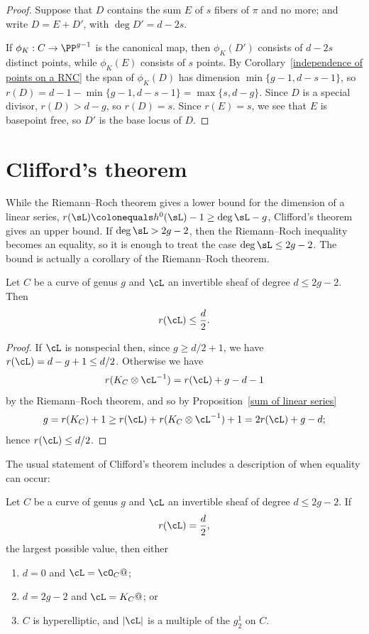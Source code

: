 \begin{proof}
Suppose that $D$ contains the sum $E$ of $s$ fibers of $\pi$ and no more; and write $D = E+D'$, with $\deg D' = d-2s$.
 
If $\phi_K:C \to \PP^{g-1}$ is the canonical map, then $\phi_K(D')$ consists of $d-2s$ distinct points, while $\phi_K(E)$ consists of
$s$ points. By Corollary~\ref{independence of points on a RNC} the span of $\phi_K(D)$ has dimension $\min\{g-1, d-s-1\}$, so 
$r(D) = d-1-\min\{g-1, d-s-1\} = \max \{s,d-g\}$. Since $D$ is a special divisor, $r(D) > d-g$, so $r(D) = s$. 
Since $r(E) =s$, we see that $E$ is basepoint free, so $D'$ is the base locus of $D$.
\end{proof}

\section{Clifford's theorem}\label{Clifford Section}

While the Riemann--Roch theorem gives a lower bound for the dimension of a linear series, $r(\sL) \colonequals h^0(\sL)-1 \geq \deg \sL -g$, Clifford's theorem
%
gives an upper bound. If $\deg \sL>2g-2$, then the Riemann--Roch
inequality becomes an equality, so it is enough to treat the case
$\deg \sL \leq 2g-2$. The bound is actually a corollary of the 
Riemann--Roch theorem.

\begin{corollary}\label{Clifford bound}
 Let $C$ be a curve of genus $g$ and $\cL$ an invertible sheaf of degree $d \leq 2g-2$. Then
$$
r(\cL) \leq \frac{d}{2}.
$$
\end{corollary}

\begin{proof}
If $\cL$ is nonspecial then, since $g\geq d/2 + 1$, we have $r(\cL) = d-g+1\leq d/2$.
Otherwise we have
$$
r(K_C\otimes \cL^{-1}) = r(\cL) +g - d - 1
$$
by the Riemann--Roch theorem,
and so by Proposition~\ref{sum of linear series}
$$
g = r(K_C)+1  \geq r(\cL) + r(K_C\otimes \cL^{-1}) +1  = 2r(\cL) +g - d;
$$
hence $r(\cL) \leq d/2$.
\end{proof}

The usual statement of Clifford's theorem includes a description of when equality can occur:

\begin{theorem}\label{Clifford}\label{Clifford equality}
Let $C$ be a curve of genus $g$ and $\cL$ an invertible sheaf of degree $d \leq 2g-2$. If
$$
r(\cL) = \frac{d}{2},
$$
the largest possible value, then either
\begin{enumerate}
\item $d=0$ and $\cL = \cO_C@$;
\item $d = 2g-2$ and $\cL = K_C@$; or
\item $C$ is hyperelliptic, and $|\cL|$ is a multiple of the $g^1_2$ on $C$.
\end{enumerate}
\end{theorem}

